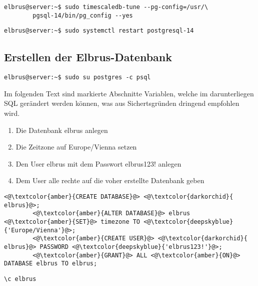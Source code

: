 \documentclass{article}
\begin{document}
	\lstset{style=commands}
	\begin{lstlisting}[caption={Anpassen der Datenbank Einstellungen auf die Server Hardware.}]
		elbrus@server:~$ sudo timescaledb-tune --pg-config=/usr/\
		pgsql-14/bin/pg_config --yes
	\end{lstlisting}

	\begin{lstlisting}[caption={Neustarten des Services um Änderungen zu übernehmen.}]
		elbrus@server:~$ sudo systemctl restart postgresql-14
	\end{lstlisting}

	\newpage
	\subsection{Erstellen der Elbrus-Datenbank}
	\begin{lstlisting}[caption={Verbinden mit dem interaktiven Terminal von 'postgres'.}]
		elbrus@server:~$ sudo su postgres -c psql
	\end{lstlisting}
	Im folgenden Text sind markierte Abschnitte Variablen, welche im darunterliegen SQL gerändert werden können, was aus Sichertsgründen dringend empfohlen wird.
	\begin{enumerate}
		\item Die Datenbank elbrus anlegen
		\item Die Zeitzone auf Europe/Vienna setzen
		\item Den User elbrus mit dem Passwort elbrus123! anlegen
		\item Dem User alle rechte auf die voher erstellte Datenbank geben
	\end{enumerate}	

	\lstset{style=files}
	\begin{lstlisting}[caption={Auführen von SQL Befehlen.}, numbers=none]
		<@\textcolor{amber}{CREATE DATABASE}@> <@\textcolor{darkorchid}{ elbrus}@>;
		<@\textcolor{amber}{ALTER DATABASE}@> elbrus <@\textcolor{amber}{SET}@> timezone TO <@\textcolor{deepskyblue}{'Europe/Vienna'}@>;
		<@\textcolor{amber}{CREATE USER}@> <@\textcolor{darkorchid}{ elbrus}@> PASSWORD <@\textcolor{deepskyblue}{'elbrus123!'}@>;
		<@\textcolor{amber}{GRANT}@> ALL <@\textcolor{amber}{ON}@> DATABASE elbrus TO elbrus;
	\end{lstlisting}
	
	\begin{lstlisting}[caption={Wechseln zu erstellter Datenbank.}, numbers=none]
		\c elbrus
	\end{lstlisting}
\end{document}
